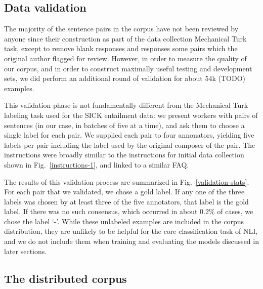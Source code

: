 
\subsection{Data validation}

The majority of the sentence pairs in the corpus have not been reviewed by anyone since their construction as part of the data collection Mechanical Turk task, except to remove blank responses and responses some pairs which the original author flagged for review. However, in order to measure the quality of our corpus, and in order to construct maximally useful testing and development sets, we did perform an additional round of validation for about 54k (TODO) examples.

This validation phase is not fundamentally different from the Mechanical Turk labeling task used for the SICK entailment data: we present workers with pairs of sentences (in our case, in batches of five at a time), and ask them to choose a single label for each pair. We supplied each pair to four annonators, yielding five labels per pair including the label used by the original composer of the pair. The instructions were broadly similar to the instructions for initial data collection shown in Fig.~\ref{instructions-1}, and linked to a similar FAQ.

The results of this validation process are summarized in Fig.~\ref{validation-stats}. For each pair that we validated, we chose a gold label. If any one of the three labels was chosen by at least three of the five annotators, that label is the gold label. If there was no such consensus, which occurred in about 0.2\% of cases, we chose the label `-'. While these unlabeled examples are included in the corpus distribution, they are unlikely to be helpful for the core classification task of NLI, and we do not include them when training and evaluating the models discussed in later sections.

\subsection{The distributed corpus}


